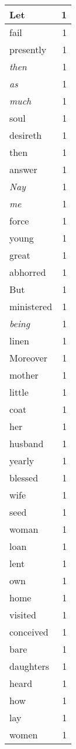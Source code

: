 \begin{center}
\begin{longtable}{l|r}
Let & 1 \\ \hline
fail & 1 \\ \hline
presently & 1 \\ \hline
\emph{then} & 1 \\ \hline
\emph{as} & 1 \\ \hline
\emph{much} & 1 \\ \hline
soul & 1 \\ \hline
desireth & 1 \\ \hline
then & 1 \\ \hline
answer & 1 \\ \hline
\emph{Nay} & 1 \\ \hline
\emph{me} & 1 \\ \hline
force & 1 \\ \hline
young & 1 \\ \hline
great & 1 \\ \hline
abhorred & 1 \\ \hline
But & 1 \\ \hline
ministered & 1 \\ \hline
\emph{being} & 1 \\ \hline
linen & 1 \\ \hline
Moreover & 1 \\ \hline
mother & 1 \\ \hline
little & 1 \\ \hline
coat & 1 \\ \hline
her & 1 \\ \hline
husband & 1 \\ \hline
yearly & 1 \\ \hline
blessed & 1 \\ \hline
wife & 1 \\ \hline
seed & 1 \\ \hline
woman & 1 \\ \hline
loan & 1 \\ \hline
lent & 1 \\ \hline
own & 1 \\ \hline
home & 1 \\ \hline
visited & 1 \\ \hline
conceived & 1 \\ \hline
bare & 1 \\ \hline
daughters & 1 \\ \hline
heard & 1 \\ \hline
how & 1 \\ \hline
lay & 1 \\ \hline
women & 1 \\ \hline

\end{longtable}
\end{center}
